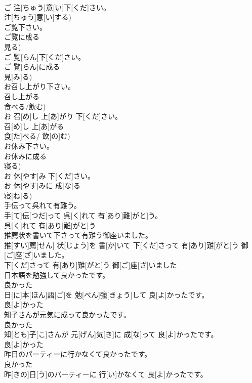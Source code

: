 \documentclass[8pt]{extreport}
\begin{document}
\begin{CJK}{UTF8}{min}
\\	ご 注[ちゅう]意[い]下[くだ]さい。 
\\	注[ちゅう]意[い]する)
\\	ご覧下さい。 
\\	ご覧に成る 
\\	見る)	
\\	ご 覧[らん]下[くだ]さい。 
\\	ご 覧[らん]に成る 
\\	見[み]る)
\\	お召し上がり下さい。 
\\	召し上がる 
\\	食べる/飲む)	
\\	お 召[め]し 上[あ]がり 下[くだ]さい。 
\\	召[め]し 上[あ]がる 
\\	食[た]べる/ 飲[の]む)
\\	お休み下さい。 
\\	お休みに成る 
\\	寝る)	
\\	お 休[やす]み 下[くだ]さい。 
\\	お 休[やす]みに 成[な]る 
\\	寝[ね]る)
\\	手伝って呉れて有難う。	
\\	手[て]伝[つだ]って 呉[く]れて 有[あり]難[がと]う。 
\\	呉[く]れて 有[あり]難[がと]う 
\\	推薦状を書いて下さって有難う御座いました。	
\\	推[すい]薦[せん] 状[じょう]を 書[か]いて 下[くだ]さって 有[あり]難[がと]う 御[ご]座[ざ]いました。 
\\	下[くだ]さって 有[あり]難[がと]う 御[ご]座[ざ]いました 
\\	日本語を勉強して良かったです。 
\\	良かった 
\\	日[に]本[ほん]語[ご]を 勉[べん]強[きょう]して 良[よ]かったです。 
\\	良[よ]かった 
\\	知子さんが元気に成って良かったです。 
\\	良かった 
\\	知[とも]子[こ]さんが 元[げん]気[き]に 成[な]って 良[よ]かったです。 
\\	良[よ]かった 
\\	昨日のパーティーに行かなくて良かったです。 
\\	良かった 
\\	昨[きの]日[う]のパーティーに 行[い]かなくて 良[よ]かったです。 

\end{CJK}
\end{document}
